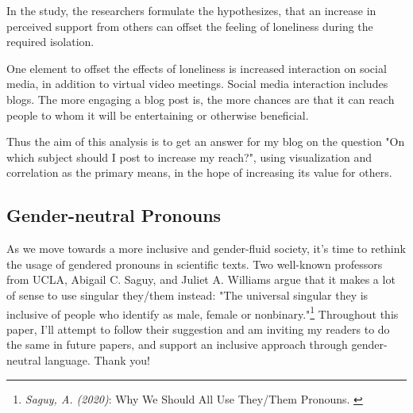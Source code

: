 In the study, the researchers formulate the hypothesizes, that an increase in perceived support from others can offset the feeling of loneliness during the required isolation.

One element to offset the effects of loneliness is increased interaction on social media, in addition to virtual video meetings. Social media interaction includes blogs. The more engaging a blog post is, the more chances are that it can reach people to whom it will be entertaining or otherwise beneficial.

Thus the aim of this analysis is to get an answer for my blog on the question "On which subject should I post to increase my reach?", using visualization and correlation as the primary means, in the hope of increasing its value for others.

\subsection{Gender-neutral Pronouns}

As we move towards a more inclusive and gender-fluid society, it's time to rethink the usage of gendered pronouns in scientific texts. Two well-known professors from UCLA, Abigail C. Saguy, and Juliet A. Williams argue that it makes a lot of sense to use singular they/them instead: "The universal singular they is inclusive of people who identify as male, female or nonbinary."\footnote{\textit{Saguy, A. (2020)}: Why We Should All Use They/Them Pronouns. \cite{pronouns}} Throughout this paper, I'll attempt to follow their suggestion and am inviting my readers to do the same in future papers, and support an inclusive approach through gender-neutral language. Thank you!
